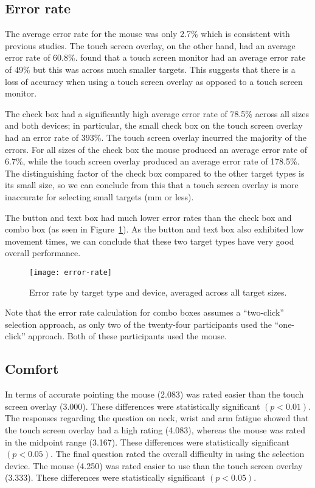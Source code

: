\documentclass{elsart}
\begin{document}
\subsection{Error rate}
\label{sec-results-error-rate}

The average error rate for the mouse was only 2.7\% which is consistent
with previous studies. The touch screen overlay, on the other hand, had
an average error rate of 60.8\%. \citet{Sear-A-1991-IJMMS} found that a
touch screen monitor had an average error rate of 49\% but this was
across much smaller targets. This suggests that there is a loss of
accuracy when using a touch screen overlay as opposed to a touch screen
monitor.

The check box had a significantly high average error rate of 78.5\%
across all sizes and both devices; in particular, the small check box on
the touch screen overlay had an error rate of 393\%. The touch screen
overlay incurred the majority of the errors. For all sizes of the check
box the mouse produced an average error rate of 6.7\%, while the touch
screen overlay produced an average error rate of 178.5\%. The
distinguishing factor of the check box compared to the other target
types is its small size, so we can conclude from this that a touch
screen overlay is more inaccurate for selecting small targets
(\unit[4]{mm} or less).

The button and text box had much lower error rates than the check box
and combo box (as seen in Figure~\ref{fig-error-rate}). As the button
and text box also exhibited low movement times, we can conclude that
these two target types have very good overall performance.


\begin{figure}
	\centering
	\texttt{[image: error-rate]}
	\caption{Error rate by target type and device, averaged across all
	target sizes.}
	\label{fig-error-rate}
\end{figure}


Note that the error rate calculation for combo boxes assumes a
``two-click'' selection approach, as only two of the twenty-four
participants used the ``one-click'' approach. Both of these participants
used the mouse.


\subsection{Comfort}
\label{sec-results-comfort}

In terms of accurate pointing the mouse (2.083) was rated easier than
the touch screen overlay (3.000). These differences were statistically
significant \((p < 0.01)\). The responses regarding the question on
neck, wrist and arm fatigue showed that the touch screen overlay had a
high rating (4.083), whereas the mouse was rated in the midpoint range
(3.167). These differences were statistically significant \((p < 0.05)\).
The final question rated the overall difficulty in using the selection
device. The mouse (4.250) was rated easier to use than the touch screen
overlay (3.333). These differences were statistically significant \((p <
0.05)\).
\end{document}
